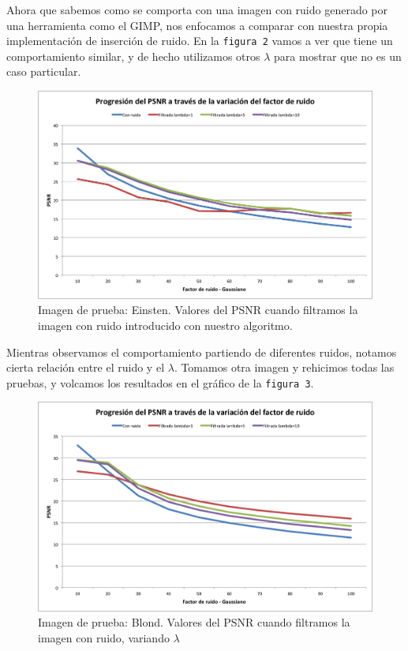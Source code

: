 \documentclass[a4paper]{article}
\begin{document}
Ahora que sabemos como se comporta con una imagen con ruido generado por una herramienta como el GIMP, nos enfocamos a comparar con nuestra propia implementación de inserción de ruido.
En la \texttt{figura 2} vamos a ver que tiene un comportamiento similar, y de hecho utilizamos otros $\lambda$ para mostrar que no es un caso particular. 
\begin{figure}[H]
  \centering
  \includegraphics[scale=0.65]{graficos/PSNR_Einstein.png}
  \caption{ Imagen de prueba: Einsten. Valores del PSNR cuando filtramos la imagen con ruido introducido con nuestro algoritmo. }
\end{figure}

Mientras observamos el comportamiento partiendo de diferentes ruidos, notamos cierta relación entre el ruido y el $\lambda$.
Tomamos otra imagen y rehicimos todas las pruebas, y volcamos los resultados en el gráfico de la \texttt{figura 3}. 

\begin{figure}[H]
  \centering
  \includegraphics[scale=0.65]{graficos/PSNR_Blond.png}
  \caption{ Imagen de prueba: Blond. Valores del PSNR cuando filtramos la imagen con ruido, variando $\lambda$}
\end{figure}
\end{document}

